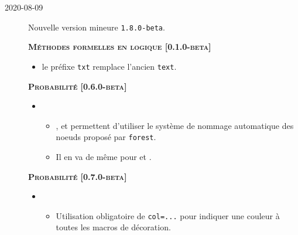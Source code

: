 \documentclass[12pt,a4paper]{book}
\begin{document}
\begin{description}
    
    \separation


    \medskip
    \item[2020-08-09] Nouvelle version mineure \verb+1.8.0-beta+.
    
    
    
    
    \begin{center}
        \textbf{\textsc{Méthodes formelles en logique [0.1.0-beta]}}
    \end{center}
    
    \begin{itemize}[itemsep=.5em]
        \item {}
              le préfixe \verb#txt# remplace l'ancien \verb#text#.
    \end{itemize}
    
    
    \separation
    
    
    
    
    \begin{center}
        \textbf{\textsc{Probabilité [0.6.0-beta]}}
    \end{center}
    
    \begin{itemize}[itemsep=.5em]
        \item {}
        \begin{itemize}[itemsep=.5em]
            \item {},  et  permettent d'utiliser le système de nommage automatique des noeuds proposé par \verb#forest#.
            
            \item Il en va de même pour  et .
        \end{itemize}
    \end{itemize}
    
    
    \begin{center}
        \textbf{\textsc{Probabilité [0.7.0-beta]}}
    \end{center}
    
    \begin{itemize}[itemsep=.5em]
        \item {}
        \begin{itemize}[itemsep=.5em]
            \item Utilisation obligatoire de \verb#col=...# pour indiquer une couleur à toutes les macros de décoration.
            

\end{itemize}
\end{itemize}
\end{description}
\end{document}

